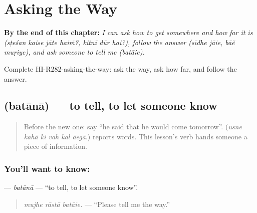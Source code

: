 
\chapter{Asking the Way}
\label{ch:hi-asking-the-way}

\begin{chapteropening}
\textbf{By the end of this chapter:} \emph{I can ask how to get somewhere and how far it is (sṭeśan kaise jāte haiṁ?, kitnī dūr hai?), follow the answer (sīdhe jāie, bāẽ muṛiye), and ask someone to tell me (batāie).}

Complete HI-R282-asking-the-way: ask the way, ask how far, and follow the answer.
\end{chapteropening}

\section[\texorpdfstring{\hi{बताना} (batānā)}{बताना (batānā)}]{ (batānā) — to tell, to let someone know}

\label{lesson:HI-C282-batana}



\begin{quote}
Before the new one: say \textquotedblleft{}he said that he would come tomorrow\textquotedblright{}. (\emph{usne kahā ki vah kal āegā}.) \textbf{} reports words. This lesson's verb hands someone a piece of information.
\end{quote}

\subsection*{You'll want to know: }
\textbf{} — \emph{batānā} — \textquotedblleft{}to tell, to let someone know\textquotedblright{}.

\begin{quote}
\textbf{  }
\end{quote}

\begin{quote}
\emph{mujhe rāstā batāie.} — \textquotedblleft{}Please tell me the way.\textquotedblright{}
\end{quote}

